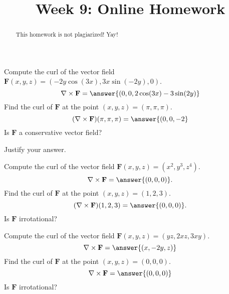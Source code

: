 \documentclass{ximera}
\title{Week 9: Online Homework}
\begin{document}
  
\begin{abstract}  
This homework is not plagiarized! Yay!
\end{abstract}  
\maketitle 

\begin{problem}
Compute the curl of the vector field $\mathbf{F}(x,y,z) = (-2y\cos(3x),3x\sin(-2y),0)$.
\[
\nabla\times \mathbf{F} = \answer{(0,0,2\cos(3x)-3\sin(2y)}
\]
Find the curl of $\mathbf{F}$ at the point $(x,y,z) = (\pi,\pi,\pi)$.
\[
(\nabla\times \mathbf{F})(\pi,\pi,\pi) = \answer{(0,0,-2}
\]
Is $\mathbf{F}$ a conservative vector field?
\begin{multipleChoice}
\end{multipleChoice}
Justify your answer.
\begin{freeResponse}
\end{freeResponse}
\end{problem}

\begin{problem}
Compute the curl of the vector field $\mathbf{F}(x,y,z) = (x^2, y^3, z^4)$.
\[
\nabla\times \mathbf{F} = \answer{(0,0,0)}.
\]
Find the curl of $\mathbf{F}$ at the point $(x,y,z) = (1,2,3)$.
\[
(\nabla\times \mathbf{F})(1,2,3) = \answer{(0,0,0)}.
\]
Is $\mathbf{F}$ irrotational?
\begin{multipleChoice}
\end{multipleChoice}
\end{problem}

\begin{problem}
Compute the curl of the vector field $\mathbf{F}(x,y,z) = (yz, 2xz, 3xy)$.
\[
\nabla\times \mathbf{F} = \answer{(x, -2y, z)}
\]
Find the curl of $\mathbf{F}$ at the point $(x,y,z) = (0,0,0)$.
\[
\nabla\times \mathbf{F} = \answer{(0, 0, 0)}
\]
Is $\mathbf{F}$ irrotational?
\begin{multipleChoice}
\end{multipleChoice}
\end{problem}
\end{document}
